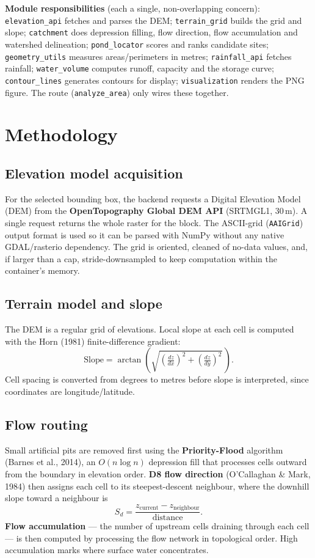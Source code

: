 \documentclass[11pt]{article}
\begin{document}
\textbf{Module responsibilities} (each a single, non-overlapping concern):
\texttt{elevation\_api} fetches and parses the DEM; \texttt{terrain\_grid} builds the
grid and slope; \texttt{catchment} does depression filling, flow direction, flow
accumulation and watershed delineation; \texttt{pond\_locator} scores and ranks
candidate sites; \texttt{geometry\_utils} measures areas/perimeters in metres;
\texttt{rainfall\_api} fetches rainfall; \texttt{water\_volume} computes runoff,
capacity and the storage curve; \texttt{contour\_lines} generates contours for
display; \texttt{visualization} renders the PNG figure. The route
(\texttt{analyze\_area}) only wires these together.

\section{Methodology}

\subsection{Elevation model acquisition}
For the selected bounding box, the backend requests a Digital Elevation Model (DEM)
from the \textbf{OpenTopography Global DEM API} (SRTMGL1, 30\,m). A single request
returns the whole raster for the block. The ASCII-grid (\texttt{AAIGrid}) output
format is used so it can be parsed with NumPy without any native GDAL/rasterio
dependency. The grid is oriented, cleaned of no-data values, and, if larger than a
cap, stride-downsampled to keep computation within the container's memory.

\subsection{Terrain model and slope}
The DEM is a regular grid of elevations. Local slope at each cell is computed with the
Horn (1981) finite-difference gradient:
\begin{equation}
\text{Slope} = \arctan\!\left(\sqrt{\left(\tfrac{dz}{dx}\right)^2 + \left(\tfrac{dz}{dy}\right)^2}\,\right).
\end{equation}
Cell spacing is converted from degrees to metres before slope is interpreted, since
coordinates are longitude/latitude.

\subsection{Flow routing}
Small artificial pits are removed first using the \textbf{Priority-Flood} algorithm
(Barnes et al., 2014), an $O(n\log n)$ depression fill that processes cells outward
from the boundary in elevation order. \textbf{D8 flow direction} (O'Callaghan \& Mark,
1984) then assigns each cell to its steepest-descent neighbour, where the downhill
slope toward a neighbour is
\begin{equation}
S_d = \frac{z_{\text{current}} - z_{\text{neighbour}}}{\text{distance}}.
\end{equation}
\textbf{Flow accumulation} --- the number of upstream cells draining through each cell
--- is then computed by processing the flow network in topological order. High
accumulation marks where surface water concentrates.
\end{document}
